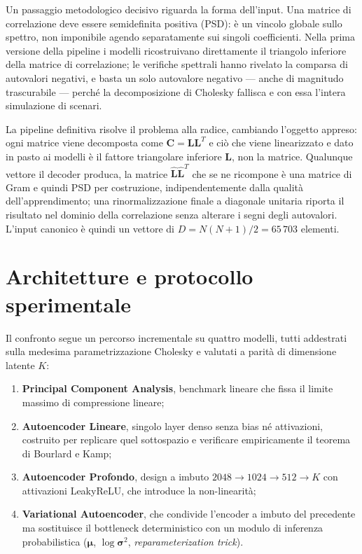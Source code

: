 \documentclass[11pt,a4paper]{article}
\begin{document}
Un passaggio metodologico decisivo riguarda la forma dell'input. Una matrice
di correlazione deve essere semidefinita positiva (PSD): è un vincolo globale
sullo spettro, non imponibile agendo separatamente sui singoli coefficienti.
Nella prima versione della pipeline i modelli ricostruivano direttamente il
triangolo inferiore della matrice di correlazione; le verifiche spettrali
hanno rivelato la comparsa di autovalori negativi, e basta un solo autovalore
negativo --- anche di magnitudo trascurabile --- perché la decomposizione di
Cholesky fallisca e con essa l'intera simulazione di scenari.

La pipeline definitiva risolve il problema alla radice, cambiando l'oggetto
appreso: ogni matrice viene decomposta come $\mathbf{C} = \mathbf{L}\mathbf{L}^T$
e ciò che viene linearizzato e dato in pasto ai modelli è il fattore
triangolare inferiore $\mathbf{L}$, non la matrice. Qualunque vettore il
decoder produca, la matrice $\hat{\mathbf{L}}\hat{\mathbf{L}}^T$ che se ne
ricompone è una matrice di Gram e quindi PSD per costruzione, indipendentemente
dalla qualità dell'apprendimento; una rinormalizzazione finale a diagonale
unitaria riporta il risultato nel dominio della correlazione senza alterare i
segni degli autovalori. L'input canonico è quindi un vettore di
$D = N(N{+}1)/2 = 65\,703$ elementi.

\section{Architetture e protocollo sperimentale}

Il confronto segue un percorso incrementale su quattro modelli, tutti
addestrati sulla medesima parametrizzazione Cholesky e valutati a parità di
dimensione latente $K$:

\begin{enumerate}[leftmargin=1.4em,itemsep=0.25em,topsep=0.35em]
  \item \textbf{Principal Component Analysis}, benchmark lineare che fissa il
        limite massimo di compressione lineare;
  \item \textbf{Autoencoder Lineare}, singolo layer denso senza bias né
        attivazioni, costruito per replicare quel sottospazio e verificare
        empiricamente il teorema di Bourlard e Kamp;
  \item \textbf{Autoencoder Profondo}, design a imbuto
        $2048 \to 1024 \to 512 \to K$ con attivazioni LeakyReLU, che introduce
        la non-linearità;
  \item \textbf{Variational Autoencoder}, che condivide l'encoder a imbuto del
        precedente ma sostituisce il bottleneck deterministico con un modulo
        di inferenza probabilistica ($\boldsymbol{\mu}$,
        $\log\boldsymbol{\sigma}^2$, \emph{reparameterization trick}).
\end{enumerate}
\end{document}
